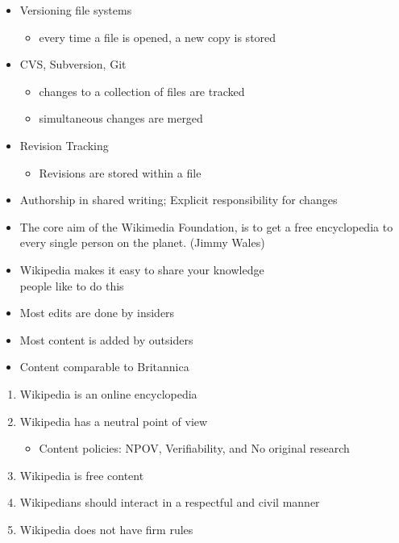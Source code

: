 \documentclass[a4paper,landscape,headrule,footrule,xetex]{foils}
\begin{document}

\begin{itemize}
\item Versioning file systems
  \begin{itemize}
  \item  every time a file is opened, a new copy is stored
  \end{itemize}
\item CVS, Subversion, Git
  \begin{itemize}
  \item changes to a collection of files are tracked
  \item simultaneous changes are merged
  \end{itemize}
\item Revision Tracking
  \begin{itemize}
  \item Revisions are stored within a file
  \end{itemize}
\item Authorship in shared writing; Explicit responsibility for changes
\end{itemize}

\begin{itemize}
\item  The core aim of the Wikimedia Foundation, is to get a free
  encyclopedia to every single person on the planet. (Jimmy Wales)
\item Wikipedia makes it easy to share your knowledge
 \\ people like to do this
\item Most edits are done by insiders
\item Most content is added by outsiders
\item Content comparable to Britannica
\end{itemize}

\begin{enumerate}
\item Wikipedia is an online encyclopedia
\item Wikipedia has a neutral point of view
  \begin{itemize}
  \item Content policies:  NPOV, Verifiability, and No original research
  \end{itemize}
\item Wikipedia is free content
\item Wikipedians should interact in a respectful and civil manner
\item Wikipedia does not have firm rules
\end{enumerate}
\end{document}
